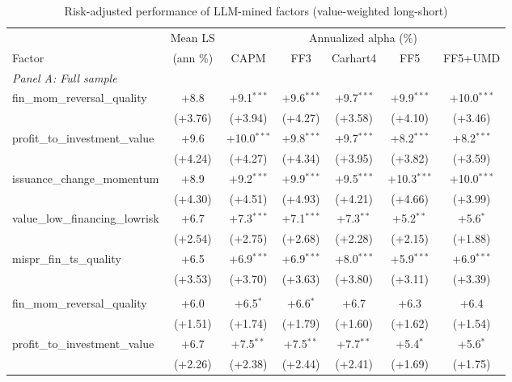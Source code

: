 \begin{table}[htbp]\centering
\caption{Risk-adjusted performance of LLM-mined factors (value-weighted long-short)}
\label{tab:alphas_vw}
\begin{threeparttable}\footnotesize
\begin{tabular}{lcccccc}
\toprule
 & Mean LS & \multicolumn{5}{c}{Annualized alpha (\%)} \\
\cmidrule(lr){3-7}
Factor & (ann \%) & CAPM & FF3 & Carhart4 & FF5 & FF5+UMD \\
\midrule
\multicolumn{7}{l}{\textit{Panel A: Full sample}} \\
\addlinespace
fin\_mom\_reversal\_quality & +8.8 & +9.1$^{***}$ & +9.6$^{***}$ & +9.7$^{***}$ & +9.9$^{***}$ & +10.0$^{***}$ \\
 & (+3.76) & (+3.94) & (+4.27) & (+3.58) & (+4.10) & (+3.46) \\
\addlinespace
profit\_to\_investment\_value & +9.6 & +10.0$^{***}$ & +9.8$^{***}$ & +9.7$^{***}$ & +8.2$^{***}$ & +8.2$^{***}$ \\
 & (+4.24) & (+4.27) & (+4.34) & (+3.95) & (+3.82) & (+3.59) \\
\addlinespace
issuance\_change\_momentum & +8.9 & +9.2$^{***}$ & +9.9$^{***}$ & +9.5$^{***}$ & +10.3$^{***}$ & +10.0$^{***}$ \\
 & (+4.30) & (+4.51) & (+4.93) & (+4.21) & (+4.66) & (+3.99) \\
\addlinespace
value\_low\_financing\_lowrisk & +6.7 & +7.3$^{***}$ & +7.1$^{***}$ & +7.3$^{**}$ & +5.2$^{**}$ & +5.6$^{*}$ \\
 & (+2.54) & (+2.75) & (+2.68) & (+2.28) & (+2.15) & (+1.88) \\
\addlinespace
mispr\_fin\_ts\_quality & +6.5 & +6.9$^{***}$ & +6.9$^{***}$ & +8.0$^{***}$ & +5.9$^{***}$ & +6.9$^{***}$ \\
 & (+3.53) & (+3.70) & (+3.63) & (+3.80) & (+3.11) & (+3.39) \\
\addlinespace
\midrule
\multicolumn{7}{l}{\textit{Panel B: Out-of-sample (post-2000-12-31)}} \\
\addlinespace
fin\_mom\_reversal\_quality & +6.0 & +6.5$^{*}$ & +6.6$^{*}$ & +6.7 & +6.3 & +6.4 \\
 & (+1.51) & (+1.74) & (+1.79) & (+1.60) & (+1.62) & (+1.54) \\
\addlinespace
profit\_to\_investment\_value & +6.7 & +7.5$^{**}$ & +7.5$^{**}$ & +7.7$^{**}$ & +5.4$^{*}$ & +5.6$^{*}$ \\
 & (+2.26) & (+2.38) & (+2.44) & (+2.41) & (+1.69) & (+1.75) \\

\end{tabular}
\end{threeparttable}
\end{table}
